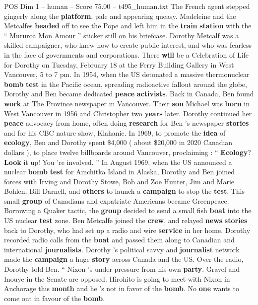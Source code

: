 \begin{textsample}{POS Dim 1 – human – Score 75.00 – t495\_human.txt}
The French agent stepped gingerly along the \textbf{platform}, pale and appearing queasy.
Madeleine and the Metcalfes \textbf{headed} off to see the Pope and left him in the \textbf{train} \textbf{station} with the “ Mururoa Mon Amour ” sticker still on his briefcase.
Dorothy Metcalf was a skilled campaigner, who knew how to create public interest, and who was fearless in the face of governments and corporations.
There \textbf{will} be a Celebration of Life for Dorothy on Tuesday, February 18 at the Ferry Building Gallery in West Vancouver, 5 to 7 pm.
In 1954, when the US detonated a massive thermonuclear \textbf{bomb} \textbf{test} in the Pacific ocean, spreading radioactive fallout around the globe, Dorothy and Ben became dedicated \textbf{peace} \textbf{activists}.
Back in Canada, Ben found \textbf{work} at The Province newspaper in Vancouver.
Their \textbf{son} Michael was \textbf{born} in West Vancouver in 1956 and Christopher two \textbf{years} later.
Dorothy continued her \textbf{peace} advocacy from home, often doing \textbf{research} for Ben ’s newspaper \textbf{stories} and for his CBC nature show, Klahanie.
In 1969, to promote the \textbf{idea} of \textbf{ecology}, Ben and Dorothy spent \$4,000 ( about \$20,000 in 2020 Canadian dollars ), to place twelve billboards around Vancouver, proclaiming : “ \textbf{Ecology}? \textbf{Look} it up!
You ’re involved. ” In August 1969, when the US announced a nuclear \textbf{bomb} \textbf{test} for Amchitka Island in Alaska, Dorothy and Ben joined forces with Irving and Dorothy Stowe, Bob and Zoe Hunter, Jim and Marie Bohlen, Bill Darnell, and \textbf{others} to launch a \textbf{campaign} to stop the \textbf{test}.
This small \textbf{group} of Canadians and expatriate Americans became Greenpeace.
Borrowing a Quaker tactic, the \textbf{group} decided to send a small fish \textbf{boat} into the US nuclear \textbf{test} zone.
Ben Metcalfe joined the \textbf{crew}, and relayed \textbf{news} \textbf{stories} back to Dorothy, who had set up a radio and wire \textbf{service} in her home.
Dorothy recorded radio calls from the \textbf{boat} and passed them along to Canadian and international \textbf{journalists}.
Dorothy ’s political savvy and \textbf{journalist} network made the \textbf{campaign} a huge \textbf{story} across Canada and the US.
Over the radio, Dorothy told Ben. “ Nixon ’s under pressure from his own \textbf{party}.
Gravel and Inouye in the Senate are opposed.
Hirohito is going to meet with Nixon in Anchorage this \textbf{month} and he ’s not in favor of the \textbf{bomb}.
No \textbf{one} wants to come out in favour of the \textbf{bomb}.

\end{textsample}
